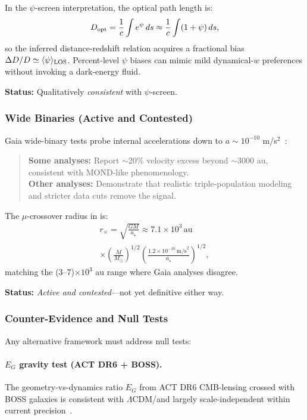 In the $\psi$-screen interpretation, the optical path length is:
\begin{equation}
D_{\rm opt} = \frac{1}{c}\int e^\psi\,ds \approx \frac{1}{c}\int(1 + \psi)\,ds,
\end{equation}
so the inferred distance-redshift relation acquires a fractional bias 
$\Delta D/D \simeq \langle\psi\rangle_{\rm LOS}$. Percent-level $\psi$ biases 
can mimic mild dynamical-$w$ preferences without invoking a dark-energy fluid.

\textbf{Status:} Qualitatively \textit{consistent} with $\psi$-screen.

\subsubsection{Wide Binaries (Active and Contested)}

Gaia wide-binary tests probe internal accelerations down to 
$a \sim 10^{-10}$ m/s$^2$~\cite{WideBinaries2025}:

\begin{quote}
\textbf{Some analyses:} Report $\sim$20\% velocity excess beyond $\sim$3000 au, 
consistent with MOND-like phenomenology.\\
\textbf{Other analyses:} Demonstrate that realistic triple-population 
modeling and stricter data cuts remove the signal.
\end{quote}

The $\mu$-crossover radius in \DFD is:
\begin{multline}
r_\times = \sqrt{\frac{GM}{a_\star}} \approx 7.1 \times 10^3\,\text{au} \\
\times \left(\frac{M}{M_\odot}\right)^{1/2}
\left(\frac{1.2 \times 10^{-10}\,\text{m/s}^2}{a_\star}\right)^{1/2},
\end{multline}
matching the (3--7)$\times 10^3$ au range where Gaia analyses disagree.

\textbf{Status:} \textit{Active and contested}---not yet definitive either way.

\subsubsection{Counter-Evidence and Null Tests}

Any alternative framework must address null tests:

\paragraph{$E_G$ gravity test (ACT DR6 + BOSS).}
The geometry-vs-dynamics ratio $E_G$ from ACT DR6 CMB-lensing crossed with 
BOSS galaxies is consistent with $\Lambda$CDM/\GR and largely scale-independent 
within current precision~\cite{ACT2025EG}.

